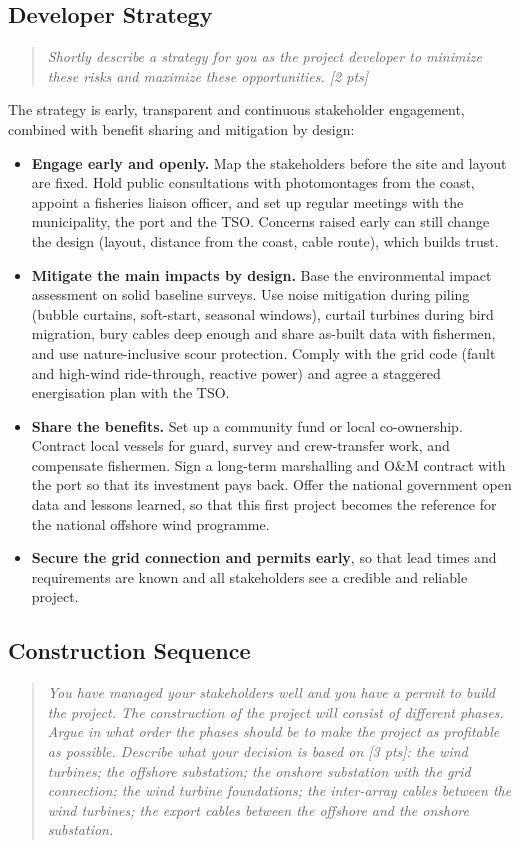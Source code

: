 \subsection{Developer Strategy}
\label{sec:elec-strategy}
\begin{quote}
\emph{Shortly describe a strategy for you as the project developer to minimize these risks and maximize these opportunities. [2 pts]}
\end{quote}

The strategy is early, transparent and continuous stakeholder engagement, combined with benefit sharing and mitigation by design:

\begin{itemize}
    \item \textbf{Engage early and openly.} Map the stakeholders before the site and layout are fixed. Hold public consultations with photomontages from the coast, appoint a fisheries liaison officer, and set up regular meetings with the municipality, the port and the TSO. Concerns raised early can still change the design (layout, distance from the coast, cable route), which builds trust.
    \item \textbf{Mitigate the main impacts by design.} Base the environmental impact assessment on solid baseline surveys. Use noise mitigation during piling (bubble curtains, soft-start, seasonal windows), curtail turbines during bird migration, bury cables deep enough and share as-built data with fishermen, and use nature-inclusive scour protection. Comply with the grid code (fault and high-wind ride-through, reactive power) and agree a staggered energisation plan with the TSO.
    \item \textbf{Share the benefits.} Set up a community fund or local co-ownership. Contract local vessels for guard, survey and crew-transfer work, and compensate fishermen. Sign a long-term marshalling and O\&M contract with the port so that its investment pays back. Offer the national government open data and lessons learned, so that this first project becomes the reference for the national offshore wind programme.
    \item \textbf{Secure the grid connection and permits early}, so that lead times and requirements are known and all stakeholders see a credible and reliable project.
\end{itemize}

\subsection{Construction Sequence}
\label{sec:elec-construction}
\begin{quote}
\emph{You have managed your stakeholders well and you have a permit to build the project. The construction of the project will consist of different phases. Argue in what order the phases should be to make the project as profitable as possible. Describe what your decision is based on [3 pts]: the wind turbines; the offshore substation; the onshore substation with the grid connection; the wind turbine foundations; the inter-array cables between the wind turbines; the export cables between the offshore and the onshore substation.}
\end{quote}

